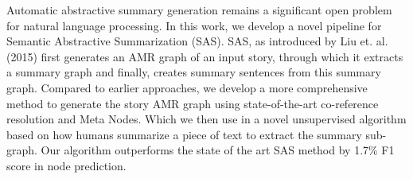 Automatic abstractive summary generation remains a significant open problem for natural language processing. In this work, we develop a novel pipeline for Semantic Abstractive Summarization (SAS). SAS, as introduced by Liu et. al. (2015) first generates an AMR graph of an input story, through which it extracts a summary graph and finally, creates summary sentences from this summary graph. Compared to earlier approaches, we develop a more comprehensive method to generate the story AMR graph using state-of-the-art co-reference resolution and Meta Nodes. Which we then use in a novel unsupervised algorithm based on how humans summarize a piece of text to extract the summary sub-graph. Our algorithm outperforms the state of the art SAS method by 1.7\% F1 score in node prediction.
